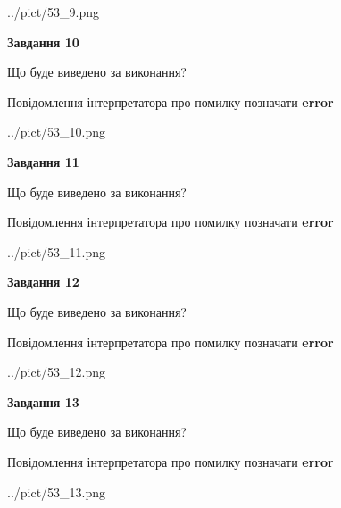 \documentclass[11pt, ukrainian]{article}
\begin{document}
{\begin {large}
\begin{center}
	{../pict/53_9.png}
\end{center}
\newpage

{\begin {center}\textbf{Завдання 10}\end {center}}\par
Що буде виведено за виконання? \par
Повідомлення інтерпретатора про помилку позначати \textbf{error}

\begin{center}
	{../pict/53_10.png}
\end{center}
\newpage

{\begin {center}\textbf{Завдання 11}\end {center}}\par
Що буде виведено за виконання? \par
Повідомлення інтерпретатора про помилку позначати \textbf{error}

\begin{center}
	{../pict/53_11.png}
\end{center}
\newpage

{\begin {center}\textbf{Завдання 12}\end {center}}\par
Що буде виведено за виконання? \par
Повідомлення інтерпретатора про помилку позначати \textbf{error}

\begin{center}
	{../pict/53_12.png}
\end{center}
\newpage

{\begin {center}\textbf{Завдання 13}\end {center}}\par
Що буде виведено за виконання? \par
Повідомлення інтерпретатора про помилку позначати \textbf{error}

\begin{center}
	{../pict/53_13.png}
\end{center}
\newpage


\end{large}}
\end{document}
